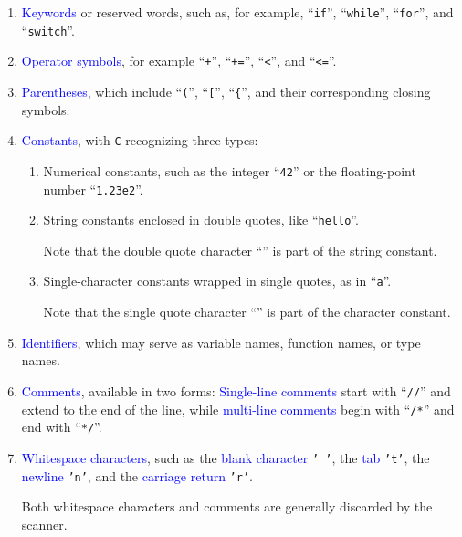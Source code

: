 \begin{enumerate}
\item \textcolor{blue}{Keywords} or reserved words, such as, for example, ``\texttt{if}'', ``\texttt{while}'', ``\texttt{for}'', and ``\texttt{switch}''.
\item \textcolor{blue}{Operator symbols}, for example ``\texttt{+}'', ``\texttt{+=}'', ``\texttt{<}'', and ``\texttt{<=}''.
\item \textcolor{blue}{Parentheses}, which include ``\texttt{(}'', ``\texttt{[}'', ``\texttt{\{}'', and their corresponding closing symbols.
\item \textcolor{blue}{Constants}, with \texttt{C} recognizing three types:
    \begin{enumerate}
    \item Numerical constants, such as the integer ``\texttt{42}'' or the floating-point number ``\texttt{1.23e2}''.
    \item String constants enclosed in double quotes, like ``\texttt{hello}''.

          Note that the double quote character ``\texttt{}'' is part of the string constant.
    \item Single-character constants wrapped in single quotes, as in ``\texttt{a}''.

          Note that the single quote character ``\texttt{}'' is part of the character constant.
    \end{enumerate}
\item \textcolor{blue}{Identifiers}, which may serve as variable names, function names, or type names.
\item \textcolor{blue}{Comments}, available in two forms: \textcolor{blue}{Single-line comments} start with
      ``\texttt{//}'' and extend to the end of the line, while \textcolor{blue}{multi-line comments} begin with
      ``\texttt{/*}'' and end with ``\texttt{*/}''. 
\item \textcolor{blue}{Whitespace characters}, such as the \textcolor{blue}{blank character} \texttt{' '}, the \textcolor{blue}{tab} \texttt{'t'}, the \textcolor{blue}{newline} \texttt{'n'}, and the \textcolor{blue}{carriage return} \texttt{'r'}. 

Both whitespace characters and comments are generally discarded by the scanner.
\end{enumerate}

